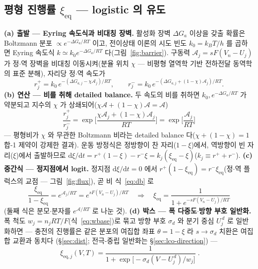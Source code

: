 \documentclass[11pt,a4paper]{article}
\newcommand{\dd}{\mathrm{d}}
\newcommand{\eq}{\mathrm{eq}}
\begin{document}
\subsection{평형 진행률 $\xi_\eq$ — logistic 의 유도}
\textbf{(a) 출발 — Eyring 속도식과 비대칭 장벽.} 활성화 장벽 $\Delta G_a$ 이상을 갖출 확률은 Boltzmann 분포
$\propto e^{-\Delta G_a/RT}$ 이고, 전이상태 이론의 시도 빈도 $k_0=k_BT/h$ 를 곱하면 Eyring 속도식
$k\simeq k_0e^{-\Delta G_a/RT}$ 다(그림~\ref{fig:barrier})\cite{eyring1935}. 구동력 $\mathcal A_j=sF(V_n-U_j)$ 가 정$\cdot$역 장벽을
비대칭 이동시켜(분율 위치 $\chi$ — 비평형 열역학 기반 전하전달 동역학의 표준 분해\cite{bazant2013}), 자리당 정$\cdot$역 속도가
\begin{equation}
r_j^+=k_0\,e^{-(\Delta G_{a,j}-\chi\mathcal A_j)/RT},\qquad
r_j^-=k_0\,e^{-(\Delta G_{a,j}+(1-\chi)\mathcal A_j)/RT}.
\label{eq:bv}
\end{equation}
\textbf{(b) 연산 — 비를 취해 detailed balance.} 두 속도의 비를 취하면 $k_0,e^{-\Delta G_a/RT}$ 가 약분되고 지수의
$\chi$ 가 상쇄되어($\chi\mathcal A+(1-\chi)\mathcal A=\mathcal A$)
\begin{equation}
\frac{r_j^+}{r_j^-}=\exp\!\Big[\frac{\chi\mathcal A_j+(1-\chi)\mathcal A_j}{RT}\Big]=\exp\!\Big[\frac{\mathcal A_j}{RT}\Big]
\label{eq:db}
\end{equation}
— 평형비가 $\chi$ 와 무관한 Boltzmann 비라는 detailed balance 다($\chi+(1-\chi)=1$ 합-1 제약이 강제한 결과). 운동
방정식은 정방향이 찬 자리($1-\xi$)에서, 역방향이 빈 자리($\xi$)에서 출발하므로
$\dd\xi/\dd t=r^+(1-\xi)-r^-\xi=k_j(\xi_\eq-\xi)$($k_j\equiv r^++r^-$). \textbf{(c) 중간식 — 정지점에서 logit.}
정지점 $\dd\xi/\dd t=0$ 에서 $r^+(1-\xi_\eq)=r^-\xi_\eq$(정$\cdot$역 플럭스의 교점 — 그림~\ref{fig:flux}), 곧
비 식~\eqref{eq:db} 로
\begin{equation}
\frac{\xi_\eq}{1-\xi_\eq}=e^{\mathcal A_j/RT}=e^{sF(V_n-U_j)/RT}
\quad\Longrightarrow\quad
\xi_\eq=\frac{1}{1+e^{-sF(V_n-U_j)/RT}}
\label{eq:logisticsolve}
\end{equation}
(둘째 식은 분모$\cdot$분자를 $e^{\mathcal A/RT}$ 로 나눈 것). \textbf{(d) 박스 — 폭 다중도$\cdot$방향 부호 일반화.}
폭 척도 $w_j=n_jRT/F$(식~\eqref{eq:wbase})로 묶고 방향 부호 $\sigma_d$ 와 분기 중심 $U_j^{\,d}$ 로 일반화하면
--- 충전의 진행률은 같은 분포의 여집합 좌표 $\theta=1-\xi$ 라 $s\to\sigma_d$ 치환은 여집합 교환과 동치다
(\S\ref{sec:dist}; 전극-중립 일반화는 \S\ref{sec:lco-direction}) ---
\begin{equation}
\boxed{\;\xi_{\eq,j}(V,T)=\frac{1}{1+\exp\!\big[-\sigma_d(V-U_j^{\,d})/w_j\big]}\;.}
\label{eq:xieq}
\end{equation}
\end{document}
